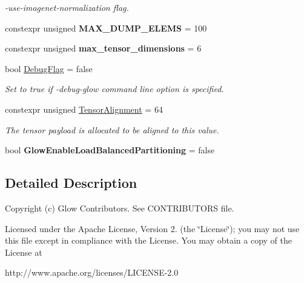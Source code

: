\begin{DoxyCompactItemize}
\begin{DoxyCompactList}\small\item\em -\/use-\/imagenet-\/normalization flag. \end{DoxyCompactList}\item 
\mbox{\label{namespaceglow_a3510e99ab11ddcc872188167c4df8f4f}} 
constexpr unsigned {\bfseries M\+A\+X\+\_\+\+D\+U\+M\+P\+\_\+\+E\+L\+E\+MS} = 100
\item 
\mbox{\label{namespaceglow_a7f08a2140a5cc78d31a81f4562f89af5}} 
constexpr unsigned {\bfseries max\+\_\+tensor\+\_\+dimensions} = 6
\item 
bool \hyperlink{namespaceglow_ad352d0b626337dc5b2e9ef7593268075}{Debug\+Flag} = false
\begin{DoxyCompactList}\small\item\em Set to true if \textquotesingle{}-\/debug-\/glow\textquotesingle{} command line option is specified. \end{DoxyCompactList}\item 
\mbox{\label{namespaceglow_ad1e03f233498b5c733d2c0a68ffe2d57}} 
constexpr unsigned \hyperlink{namespaceglow_ad1e03f233498b5c733d2c0a68ffe2d57}{Tensor\+Alignment} = 64
\begin{DoxyCompactList}\small\item\em The tensor payload is allocated to be aligned to this value. \end{DoxyCompactList}\item 
\mbox{\label{namespaceglow_af9609dfd219f56d45c74ba38656f8dca}} 
bool {\bfseries Glow\+Enable\+Load\+Balanced\+Partitioning} = false
\end{DoxyCompactItemize}


\subsection{Detailed Description}
Copyright (c) Glow Contributors. See C\+O\+N\+T\+R\+I\+B\+U\+T\+O\+RS file.

Licensed under the Apache License, Version 2. (the \char`\"{}\+License\char`\"{}); you may not use this file except in compliance with the License. You may obtain a copy of the License at \begin{DoxyVerb}http://www.apache.org/licenses/LICENSE-2.0
\end{DoxyVerb}


